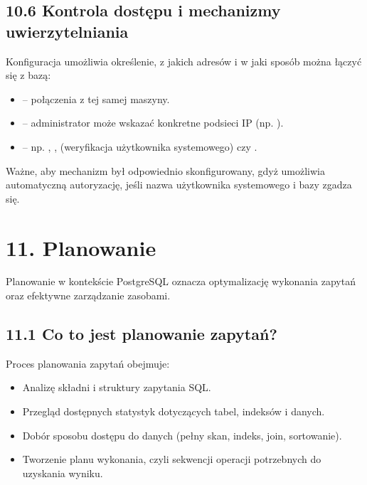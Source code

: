 \documentclass[a4paper,11pt,polish]{sphinxmanual}
\begin{document}
\subsection{10.6 Kontrola dostępu i mechanizmy uwierzytelniania}
\label{\detokenize{Konfiguracja_baz_danych/Konfiguracja_baz_danych:kontrola-dostepu-i-mechanizmy-uwierzytelniania}}
\sphinxAtStartPar
Konfiguracja umożliwia określenie, z jakich adresów i w jaki sposób można łączyć się z bazą:
\begin{itemize}
\item {} 
\sphinxAtStartPar
{} – połączenia z tej samej maszyny.

\item {} 
\sphinxAtStartPar
{} – administrator może wskazać konkretne podsieci IP (np. ).

\item {} 
\sphinxAtStartPar
{} – np. , ,  (weryfikacja użytkownika systemowego) czy .

\end{itemize}

\sphinxAtStartPar
Ważne, aby mechanizm  był odpowiednio skonfigurowany, gdyż umożliwia automatyczną autoryzację, jeśli nazwa użytkownika systemowego i bazy zgadza się.


\section{11. Planowanie}
\label{\detokenize{Konfiguracja_baz_danych/Konfiguracja_baz_danych:planowanie}}
\sphinxAtStartPar
Planowanie w kontekście PostgreSQL oznacza optymalizację wykonania zapytań oraz efektywne zarządzanie zasobami.


\subsection{11.1 Co to jest planowanie zapytań?}
\label{\detokenize{Konfiguracja_baz_danych/Konfiguracja_baz_danych:co-to-jest-planowanie-zapytan}}
\sphinxAtStartPar
Proces planowania zapytań obejmuje:
\begin{itemize}
\item {} 
\sphinxAtStartPar
Analizę składni i struktury zapytania SQL.

\item {} 
\sphinxAtStartPar
Przegląd dostępnych statystyk dotyczących tabel, indeksów i danych.

\item {} 
\sphinxAtStartPar
Dobór sposobu dostępu do danych (pełny skan, indeks, join, sortowanie).

\item {} 
\sphinxAtStartPar
Tworzenie planu wykonania, czyli sekwencji operacji potrzebnych do uzyskania wyniku.

\end{itemize}
\end{document}
